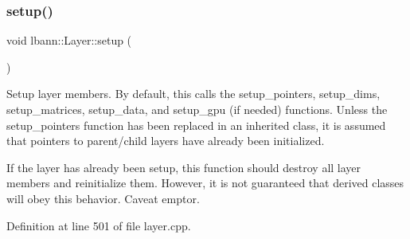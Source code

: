 \subsubsection{\texorpdfstring{setup()}{setup()}}
{\footnotesize\ttfamily void lbann\+::\+Layer\+::setup (\begin{DoxyParamCaption}{ }\end{DoxyParamCaption})\hspace{0.3cm}{\ttfamily [virtual]}}

Setup layer members. By default, this calls the setup\+\_\+pointers, setup\+\_\+dims, setup\+\_\+matrices, setup\+\_\+data, and setup\+\_\+gpu (if needed) functions. Unless the setup\+\_\+pointers function has been replaced in an inherited class, it is assumed that pointers to parent/child layers have already been initialized.

If the layer has already been setup, this function should destroy all layer members and reinitialize them. However, it is not guaranteed that derived classes will obey this behavior. Caveat emptor. 

Definition at line 501 of file layer.\+cpp.


